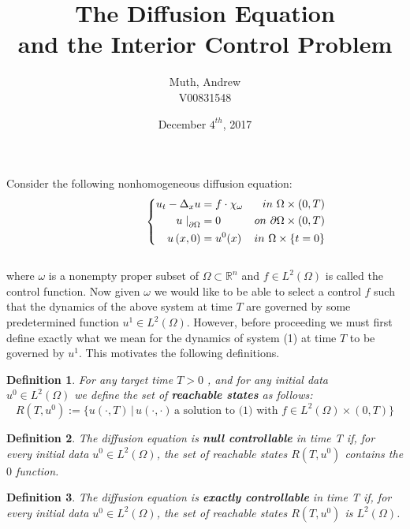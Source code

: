 \documentclass[11pt]{article}
\author{Muth, Andrew\\ V00831548}
\title{The Diffusion Equation\\ and the Interior Control Problem}
\date{December $4^{th}$, 2017}
\newcommand\tab[1][1cm]{\hspace*{#1}}
\newtheorem{definition}{Definition}
\begin{document}
\begin{titlepage}
\maketitle%
\end{titlepage}
Consider the following nonhomogeneous diffusion equation:\\
\begin{equation}
\tab\tab \left\{\begin{aligned}
        u_t-\Delta_x u &= f\cdot\chi_\omega &in\,\, \Omega\times\left(0,T\right)\\
        u\left.\right\vert_{\partial\Omega}&= 0 &on\,\, \partial\Omega\times\left(0,T\right)\\
        u\left(x,0\right) &= u^0(x) &in\,\, \Omega\times\left\{t=0\right\}
       \end{aligned}
 \right.
\end{equation}\\ 

where $\omega$ is a nonempty proper subset of  $\Omega \subset \mathbb{R}^n$ and $f \in L^2(\Omega)$ is called the control function. Now given $\omega$ we would like to be able to select a control $f$ such that the dynamics of the above system at time $T$ are governed by some predetermined function $u^1 \in L^2(\Omega)$. However, before proceeding we must first define exactly what we mean for the dynamics of system (1) at time $T$ to be governed by $u^1$. This motivates the following definitions. 

\begin{definition}
For any target time $T>0$ , and for any initial data\\ $u^0\in L^2(\Omega)$ we define the set of \textbf{reachable states} as follows: $$R(T,u^0):=\{u(\cdot,T)\,|\,u(\cdot,\cdot)\, \text{a solution to (1) with } f\in L^2(\Omega)\times (0,T)\}$$
\end{definition}

\begin{definition}
The diffusion equation is \textbf{null controllable} in time T if, for every initial data $u^0\in L^2(\Omega)$, the set of reachable states $R(T,u^0)$ contains  the $0$ function.
\end{definition}

\begin{definition}
The diffusion equation is \textbf{exactly controllable} in time T if, for every initial data $u^0\in L^2(\Omega)$, the set of reachable states $R(T,u^0)$ is $L^2(\Omega)$.
\end{definition}
\end{document}
